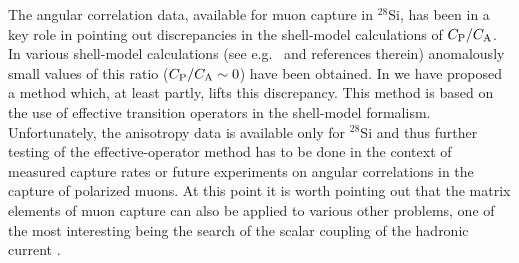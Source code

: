 \documentclass[12pt]{iopart}
\begin{document}
The
angular correlation data, available for muon capture in $^{28}$Si, has been
in a key role in pointing out discrepancies in the shell-model calculations
of $C_{\rm P}/C_{\rm A}$. In various shell-model  calculations (see e.g.\ \cite{mof97,sii99}
and references therein) anomalously small values of this ratio 
($C_{\rm P}/C_{\rm A}\sim 0$) have been obtained. 
In \cite{sii99} we have proposed a method
which,
at least partly, lifts this discrepancy. This method is based on the use of
effective transition operators in the shell-model formalism. Unfortunately, the
anisotropy data is available only for $^{28}$Si and thus further testing of the
effective-operator method has to be done in the context of measured capture
rates or future experiments on angular correlations in the capture of polarized
muons. At this point it is worth pointing out that the matrix elements of muon
capture
can also be applied to various other problems, one of the most interesting
being the search of the scalar coupling of the hadronic current \cite{ego88}.
\end{document}
